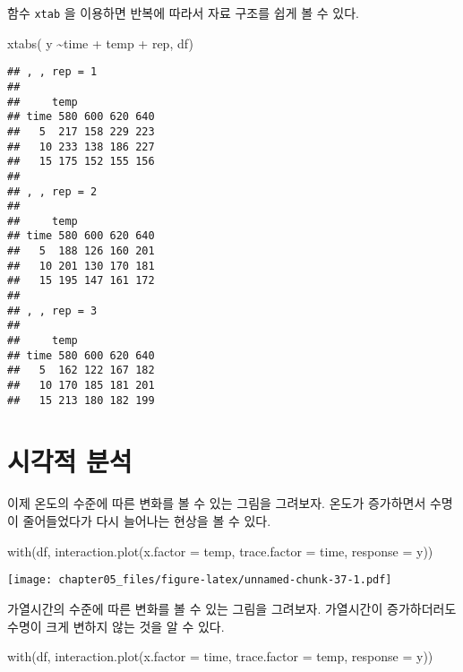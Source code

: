 \documentclass[
]{book}
\newenvironment{Shaded}{\begin{snugshade}}{\end{snugshade}}
\newcommand{\AttributeTok}[1]{\textcolor[rgb]{0.77,0.63,0.00}{#1}}
\newcommand{\FunctionTok}[1]{\textcolor[rgb]{0.00,0.00,0.00}{#1}}
\newcommand{\NormalTok}[1]{#1}
\newcommand{\SpecialCharTok}[1]{\textcolor[rgb]{0.00,0.00,0.00}{#1}}
\begin{document}
함수 \texttt{xtab} 을 이용하면 반복에 따라서 자료 구조를 쉽게 볼 수 있다.

\begin{Shaded}
\begin{Highlighting}[]
\FunctionTok{xtabs}\NormalTok{( y }\SpecialCharTok{\textasciitilde{}}\NormalTok{time }\SpecialCharTok{+}\NormalTok{ temp }\SpecialCharTok{+}\NormalTok{ rep, df)}
\end{Highlighting}
\end{Shaded}

\begin{verbatim}
## , , rep = 1
## 
##     temp
## time 580 600 620 640
##   5  217 158 229 223
##   10 233 138 186 227
##   15 175 152 155 156
## 
## , , rep = 2
## 
##     temp
## time 580 600 620 640
##   5  188 126 160 201
##   10 201 130 170 181
##   15 195 147 161 172
## 
## , , rep = 3
## 
##     temp
## time 580 600 620 640
##   5  162 122 167 182
##   10 170 185 181 201
##   15 213 180 182 199
\end{verbatim}

\hypertarget{uxc2dcuxac01uxc801-uxbd84uxc11d-3}{%
\section{시각적 분석}\label{uxc2dcuxac01uxc801-uxbd84uxc11d-3}}

이제 온도의 수준에 따른 변화를 볼 수 있는 그림을 그려보자. 온도가 증가하면서 수명이 줄어들었다가 다시 늘어나는 현상을 볼 수 있다.

\begin{Shaded}
\begin{Highlighting}[]
\FunctionTok{with}\NormalTok{(df, }\FunctionTok{interaction.plot}\NormalTok{(}\AttributeTok{x.factor =}\NormalTok{ temp, }\AttributeTok{trace.factor =}\NormalTok{ time, }\AttributeTok{response =}\NormalTok{ y))}
\end{Highlighting}
\end{Shaded}

\texttt{[image: chapter05\_files/figure-latex/unnamed-chunk-37-1.pdf]}

가열시간의 수준에 따른 변화를 볼 수 있는 그림을 그려보자. 가열시간이 증가하더러도 수명이 크게 변하지 않는 것을 알 수 있다.

\begin{Shaded}
\begin{Highlighting}[]
\FunctionTok{with}\NormalTok{(df, }\FunctionTok{interaction.plot}\NormalTok{(}\AttributeTok{x.factor =}\NormalTok{ time, }\AttributeTok{trace.factor =}\NormalTok{ temp, }\AttributeTok{response =}\NormalTok{ y))}
\end{Highlighting}
\end{Shaded}
\end{document}
